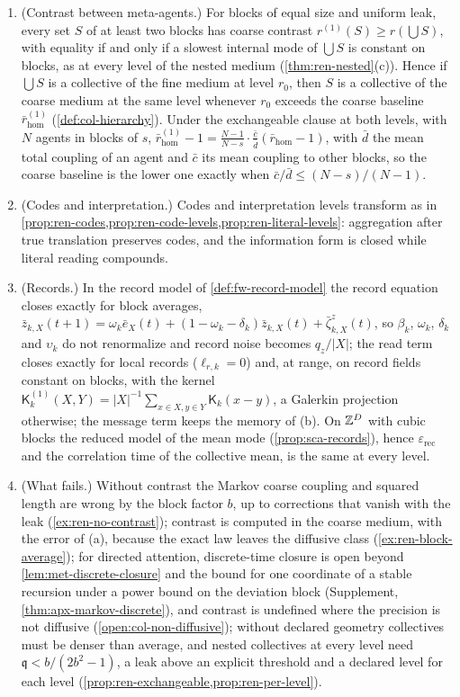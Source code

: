 \begin{theorem}
\begin{enumerate}
\item[(c)] (Contrast between meta-agents.) For blocks of equal size and uniform leak, every set $S$ of at least two blocks has coarse contrast $r^{(1)}(S)\ge r(\bigcup S)$, with equality if and only if a slowest internal mode of $\bigcup S$ is constant on blocks, as at every level of the nested medium (\cref{thm:ren-nested}(c)). Hence if $\bigcup S$ is a collective of the fine medium at level $r_0$, then $S$ is a collective of the coarse medium at the same level whenever $r_0$ exceeds the coarse baseline $\bar r^{(1)}_{\mathrm{hom}}$ (\cref{def:col-hierarchy}). Under the exchangeable clause at both levels, with $N$ agents in blocks of $s$, $\bar r^{(1)}_{\mathrm{hom}}-1=\frac{N-1}{N-s}\cdot\frac{\bar c}{\bar d}(\bar r_{\mathrm{hom}}-1)$, with $\bar d$ the mean total coupling of an agent and $\bar c$ its mean coupling to other blocks, so the coarse baseline is the lower one exactly when $\bar c/\bar d\le(N-s)/(N-1)$.
\item[(d)] (Codes and interpretation.) Codes and interpretation levels transform as in \cref{prop:ren-codes,prop:ren-code-levels,prop:ren-literal-levels}: aggregation after true translation preserves codes, and the information form is closed while literal reading compounds.
\item[(e)] (Records.) In the record model of \cref{def:fw-record-model} the record equation closes exactly for block averages, $\bar z_{k,X}(t+1)=\omega_k\bar e_X(t)+(1-\omega_k-\delta_k)\bar z_{k,X}(t)+\bar\zeta^z_{k,X}(t)$, so $\beta_k$, $\omega_k$, $\delta_k$ and $\upsilon_k$ do not renormalize and record noise becomes $q_z/\lvert X\rvert$; the read term closes exactly for local records ($\ell_{r,k}=0$) and, at range, on record fields constant on blocks, with the kernel $\mathsf K^{(1)}_k(X,Y)=\lvert X\rvert^{-1}\sum_{x\in X,y\in Y}\mathsf K_k(x-y)$, a Galerkin projection otherwise; the message term keeps the memory of (b). On $\mathbb{Z}^D$ with cubic blocks the reduced model of the mean mode (\cref{prop:sca-records}), hence $\varepsilon_{\mathrm{rec}}$ and the correlation time of the collective mean, is the same at every level.
\item[(f)] (What fails.) Without contrast the Markov coarse coupling and squared length are wrong by the block factor $b$, up to corrections that vanish with the leak (\cref{ex:ren-no-contrast}); contrast is computed in the coarse medium, with the error of (a), because the exact law leaves the diffusive class (\cref{ex:ren-block-average}); for directed attention, discrete-time closure is open beyond \cref{lem:met-discrete-closure} and the bound for one coordinate of a stable recursion under a power bound on the deviation block (Supplement, \cref{thm:apx-markov-discrete}), and contrast is undefined where the precision is not diffusive (\cref{open:col-non-diffusive}); without declared geometry collectives must be denser than average, and nested collectives at every level need $\mathfrak q<b/(2b^2-1)$, a leak above an explicit threshold and a declared level for each level (\cref{prop:ren-exchangeable,prop:ren-per-level}).
\end{enumerate}
\end{theorem}
